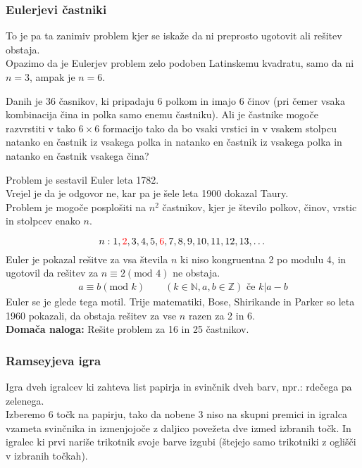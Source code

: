 \subsubsection{Eulerjevi častniki}
To je pa ta zanimiv problem kjer se iskaže da ni preprosto ugotovit ali rešitev obstaja. \\
Opazimo da je Eulerjev problem zelo podoben Latinskemu kvadratu, samo da ni $n = 3$, ampak je $n = 6$.
\begin{center}
\end{center}
Danih je 36 časnikov, ki pripadaju 6 polkom in imajo 6 činov (pri čemer vsaka kombinacija čina in polka samo enemu častniku). Ali je častnike mogoče razvrstiti v tako $6 \times 6$ formacijo tako da bo vsaki vrstici in v vsakem stolpcu natanko en častnik iz vsakega polka in natanko en častnik iz vsakega polka in natanko en častnik vsakega čina?
\begin{center}
\end{center}
Problem je sestavil Euler leta 1782. \\
Vrejel je da je odgovor ne, kar pa je šele leta 1900 dokazal Taury. \\
Problem je mogoče posplošiti na $n^2$ častnikov, kjer je število polkov, činov, vrstic in stolpcev enako $n$.
\begin{center}
    
\end{center}
$$
n: 1, \textcolor{red}{2}, 3, 4, 5, \textcolor{red}{6}, 7, 8, 9, 10, 11, 12, 13,\dots
$$
Euler je pokazal rešitve za vsa števila $n$ ki niso kongruentna 2 po modulu 4, in ugotovil da rešitev za $n \equiv 2 (\text{mod } 4)$ ne obstaja.
\begin{align*}
    a \equiv b (\text{mod } k) \text{ } \text{ } \text{ } (k \in \mathbb{N}, a,b \in \mathbb{Z}) \text{ če } k | a - b
\end{align*}
Euler se je glede tega motil. Trije matematiki, Bose, Shirikande in Parker so leta 1960 pokazali, da obstaja rešitev za vse $n$ razen za 2 in 6. \\

\noindent
\textbf{Domača naloga:} Rešite problem za 16 in 25 častnikov.

\subsubsection{Ramseyjeva igra}
\begin{center}
    
\end{center}
Igra dveh igralcev ki zahteva list papirja in svinčnik dveh barv, npr.: rdečega pa zelenega. \\
Izberemo 6 točk na papirju, tako da nobene 3 niso na skupni premici in igralca vzameta svinčnika in izmenjojoče z daljico povežeta dve izmed izbranih točk. In igralec ki prvi nariše trikotnik svoje barve izgubi (štejejo samo trikotniki z oglišči v izbranih točkah). \\

